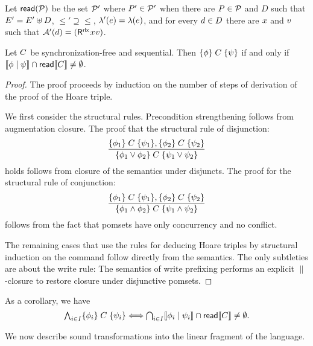 Let ${\mathsf{read}}(\mathcal{P})$ be the set $\mathcal{P}'$ where $P'\in\mathcal{P}'$ when there are
$P\in\mathcal{P}$ and $D$ such that $E'= E'\uplus D$,
${\le'} \supseteq{\le}$, $\lambda'(e) = \lambda(e)$, and for every
$d\in D$ there are $x$ and $v$ such that
$\labelingAct'(\bEv)=(\DR[\modeRLX]{\aLoc}{\aVal})$.

\begin{theorem}
  Let $C$ be synchronization-free and sequential.  Then
  $\{\phi\}\allowbreak\;C\;\allowbreak\{\psi\}$ if and only if
  $\llbracket\phi\mid\psi\rrbracket\cap\mathsf{read}\llbracket C\rrbracket\neq\emptyset$.
\begin{proof}
  The proof proceeds by induction on the number of steps of derivation of the
  proof of the Hoare triple.

  We first consider the structural rules.  Precondition strengthening follows
  from augmentation closure.  The proof that the structural rule of
  disjunction:
  \begin{displaymath}
    \frac{\{\phi_1\}\allowbreak\;C\;\allowbreak\{\psi_1\},  \{\phi_2\}\allowbreak\;C\;\allowbreak\{\psi_2\}}{ \{\phi_1 \lor \phi_2\}\allowbreak\;C\;\allowbreak\{\psi_1\lor \psi_2\}} 
  \end{displaymath}
  holds  follows from closure of the semantics under disjuncts. The proof for the structural rule of conjunction:
  \begin{displaymath}
    \frac{\{\phi_1\}\allowbreak\;C\;\allowbreak\{\psi_1\},  \{\phi_2\}\allowbreak\;C\;\allowbreak\{\psi_2\}}{ \{\phi_1 \land \phi_2\}\allowbreak\;C\;\allowbreak\{\psi_1\land \psi_2\}} 
  \end{displaymath}
  follows from the fact that pomsets have only concurrency and no conflict.  

  The remaining cases that use the rules for deducing Hoare triples by
  structural induction on the command follow directly from the semantics.
  The only subtleties are about the write rule: The semantics of write
  prefixing performs an explicit $\parallel$-closure to restore closure under
  disjunctive pomsets.
\end{proof}
\end{theorem}
As a corollary, we have
\begin{displaymath}
  \textstyle\bigwedge_{i\in I}\{\phi_i\}\allowbreak\;C\;\allowbreak\{\psi_i\} \Longleftrightarrow
  \textstyle\bigcap_{i\in I}\llbracket\phi_i\mid\psi_i\rrbracket\cap\mathsf{read}\llbracket C\rrbracket\neq\emptyset.
\end{displaymath}

We now describe sound transformations into the linear fragment of the
language.


